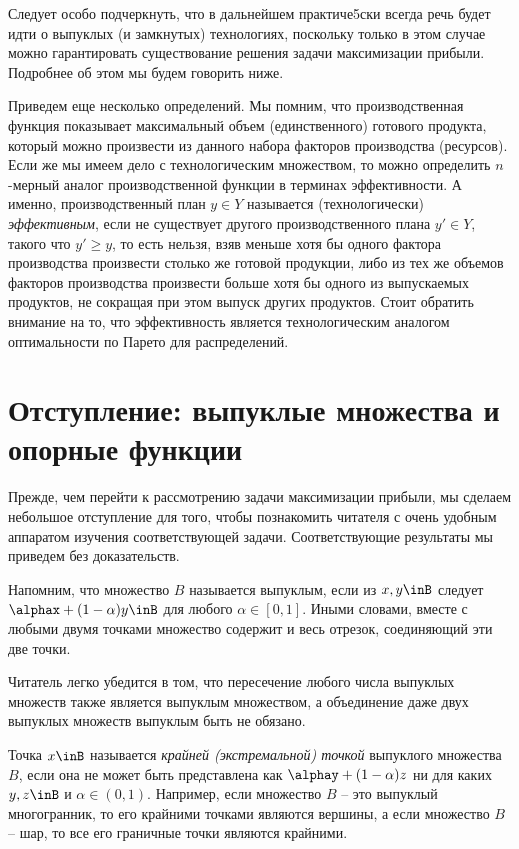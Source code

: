 Следует особо подчеркнуть, что в дальнейшем практиче5ски всегда
речь будет идти о выпуклых (и замкнутых) технологиях, поскольку только в этом
случае можно гарантировать существование решения задачи максимизации
прибыли. Подробнее об этом мы будем говорить ниже.

Приведем еще несколько определений. Мы помним, что производственная
функция показывает максимальный объем (единственного) готового продукта,
который можно произвести из данного набора факторов производства (ресурсов).
Если же мы имеем дело с технологическим множеством, то
можно определить $n$-мерный аналог производственной функции в
терминах эффективности. А именно,
производственный план $y\in Y$ называется (технологически)
\emph{эффективным}, если не существует другого
производственного плана $y'\in Y$, такого что $y'\ge y$,
то есть нельзя, взяв меньше хотя бы одного фактора производства
произвести столько же готовой продукции, либо из тех же объемов
факторов производства произвести больше хотя бы одного из
выпускаемых продуктов, не сокращая при этом выпуск других
продуктов. Стоит обратить внимание на то, что эффективность является
технологическим аналогом оптимальности по Парето для распределений.


\section*{Отступление: выпуклые множества и опорные функции}

Прежде, чем перейти к рассмотрению задачи максимизации прибыли,
мы сделаем небольшое отступление для того, чтобы познакомить читателя
с очень удобным аппаратом изучения соответствующей задачи.
Соответствующие результаты мы приведем без доказательств.

Напомним, что множество $B$ называется выпуклым, если из
$x,y\inB$ следует $\alphax+(1-\alpha)y\inB$ для любого
$\alpha\in[0,1]$. Иными словами, вместе с любыми двумя точками
множество содержит и весь отрезок, соединяющий эти две точки.

Читатель легко убедится в том, что пересечение любого числа
выпуклых множеств  также является выпуклым множеством, а объединение
даже двух выпуклых множеств выпуклым быть не обязано.

Точка $x\inB$ называется \emph{крайней (экстремальной) точкой} выпуклого
множества $B$, если она не может быть представлена как
$\alphay+(1-\alpha)z$ ни для каких $y,z\inB$ и $\alpha\in(0,1)$.
Например, если множество $B$ -- это выпуклый многогранник, то
его крайними точками являются вершины, а если множество $B$ -- шар, то
все его граничные точки являются крайними.

